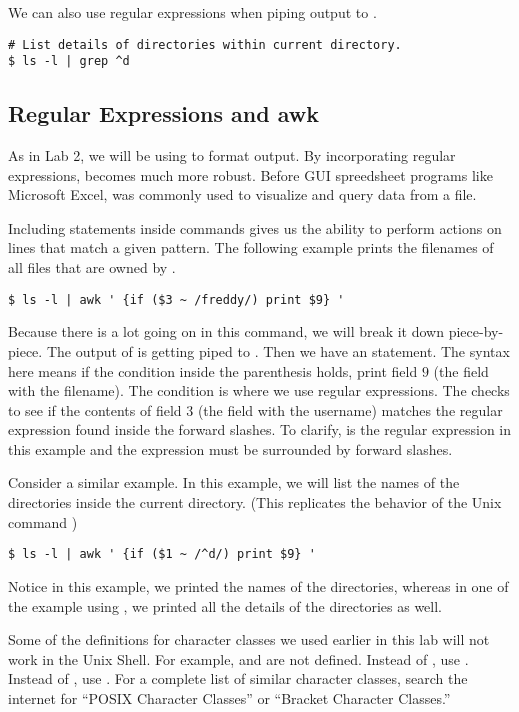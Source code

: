 We can also use regular expressions when piping output to .
\begin{lstlisting}
# List details of directories within current directory.
$ ls -l | grep ^d
\end{lstlisting}

\subsection*{Regular Expressions and awk}
As in Lab 2, we will be using  to format output. By incorporating regular expressions,  becomes much more robust. Before GUI spreedsheet programs like Microsoft Excel,  was commonly used to visualize and query data from a file.

Including  statements inside  commands gives us the ability to perform actions on lines that match a given pattern. The following example prints the filenames of all files that are owned by .
\begin{lstlisting}
$ ls -l | awk ' {if ($3 ~ /freddy/) print $9} '
\end{lstlisting}

Because there is a lot going on in this command, we will break it down piece-by-piece. The output of  is getting piped to . Then we have an  statement. The syntax here means if the condition inside the parenthesis holds, print field $9$ (the field with the filename). The condition is where we use regular expressions. The \li{\~} checks to see if the contents of field $3$ (the field with the username) matches the regular expression found inside the forward slashes. To clarify,  is the regular expression in this example and the expression must be surrounded by forward slashes.

Consider a similar example. In this example, we will list the names of the directories inside the current directory. (This replicates the behavior of the Unix command )

\begin{lstlisting}
$ ls -l | awk ' {if ($1 ~ /^d/) print $9} '
\end{lstlisting}

Notice in this example, we printed the names of the directories, whereas in one of the example using , we printed all the details of the directories as well.

\begin{warn}
Some of the definitions for character classes we used earlier in this lab will not work in the Unix Shell. For example, \li{\\w} and \li{\\d} are not defined. Instead of \li{\\w}, use \li{[[:alnum:]]}. Instead of \li{\\d}, use \li{[[:digit:]]}. For a complete list of similar character classes, search the internet for ``POSIX Character Classes'' or ``Bracket Character Classes.''
\end{warn}

